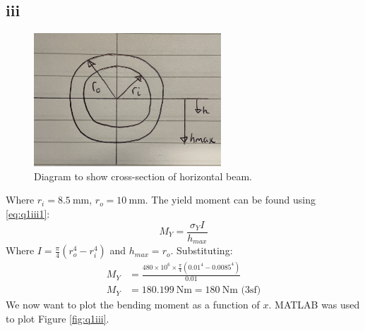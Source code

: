 \documentclass[11pt]{article}
\numberwithin{equation}{section}
\begin{document}
\subsection{iii}
\begin{figure}[H]
    \centering
    \includegraphics[height =5cm]{./img/q1iii.jpg}
    \caption{Diagram to show cross-section of horizontal beam.}
\end{figure}
Where $r_i = \SI{8.5}{\milli \meter}$, $r_o = \SI{10}{\milli \meter}$. The yield moment can be found using \ref{eq:q1iii1}:
\begin{equation}
    M_Y = \frac{\sigma_Y I}{h_{max}} \label{eq:q1iii1}
\end{equation}
Where $I = \frac{\pi}{4}\left(r_o^4-r_i^4\right)$ and $h_{max} = r_o$. Substituting:
\begin{align}
    M_Y &= \frac{480\times 10^6 \times \frac{\pi}{4}\left(0.01^4-0.0085^4\right)}{0.01}\\
    M_Y &= \SI{180.199}{\newton \meter} = \SI{180}{\newton \meter} \textrm{ (3sf)}
\end{align}
We now want to plot the bending moment as a function of $x$. MATLAB was used to plot Figure \ref{fig:q1iii}.

\end{document}
